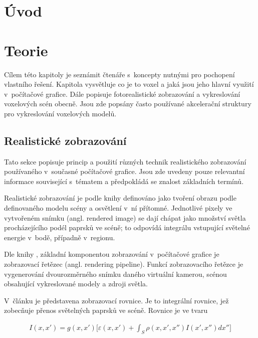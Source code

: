 \chapter{Úvod}
\label{uvod}

\chapter{Teorie}
\label{teorie}
Cílem této kapitoly je seznámit čtenáře s~koncepty nutnými pro pochopení vlastního řešení. Kapitola vysvětluje co je to voxel a jaká jsou jeho hlavní využití v~počítačové grafice. Dále popisuje fotorealistické zobrazování a vykreslování voxelových scén obecně. Jsou zde popsány často používané akcelerační struktury pro vykreslování voxelových modelů.

\section{Realistické zobrazování}
Tato sekce popisuje princip a použití různých technik realistického zobrazování používaného v~současné počítačové grafice. Jsou zde uvedeny pouze relevantní informace související s~tématem a předpokládá se znalost základních termínů.

Realistické zobrazování je podle knihy \cite{gfx_principles_practice} definováno jako tvoření obrazu podle definovaného modelu scény a osvětlení v~ní přítomné. Jednotlivé pixely ve vytvořeném snímku (angl. rendered image) se dají chápat jako množství světla procházejícího podél paprsků ve scéně; to odpovídá integrálu vstupující světelné energie v~bodě, případně v~regionu.

Dle knihy \cite{real_time_render}, základní komponentou zobrazování v~počítačové grafice je zobrazovací řetězec (angl. rendering pipeline). Funkcí zobrazovacího řetězce je vygenerování dvourozměrného snímku daného virtuální kamerou, scénou obsahující vykreslované modely a zdroji světla.

V~článku \cite{render_eq} je představena zobrazovací rovnice. Je to integrální rovnice, jež zobecňuje přenos světelných paprsků ve scéně. Rovnice je ve tvaru

\begin{equation} \label{eq:render}
	\begin{gathered}
		I(x, x') = g(x, x') \Big[\varepsilon(x, x') + \int_S\rho(x, x', x'')I(x', x'')dx''\Big]
	\end{gathered}
\end{equation}

